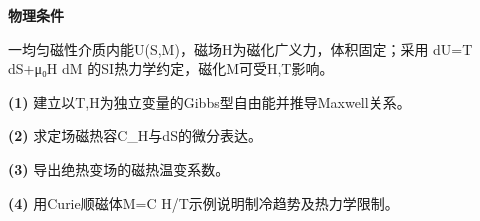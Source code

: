 \textbf{物理条件}\par 一均匀磁性介质内能U(S,M)，磁场H为磁化广义力，体积固定；采用 dU=T dS+μ₀H dM 的SI热力学约定，磁化M可受H,T影响。
\par\noindent\textbf{(1)} 建立以T,H为独立变量的Gibbs型自由能并推导Maxwell关系。
\par\noindent\textbf{(2)} 求定场磁热容C\_H与dS的微分表达。
\par\noindent\textbf{(3)} 导出绝热变场的磁热温变系数。
\par\noindent\textbf{(4)} 用Curie顺磁体M=C H/T示例说明制冷趋势及热力学限制。
